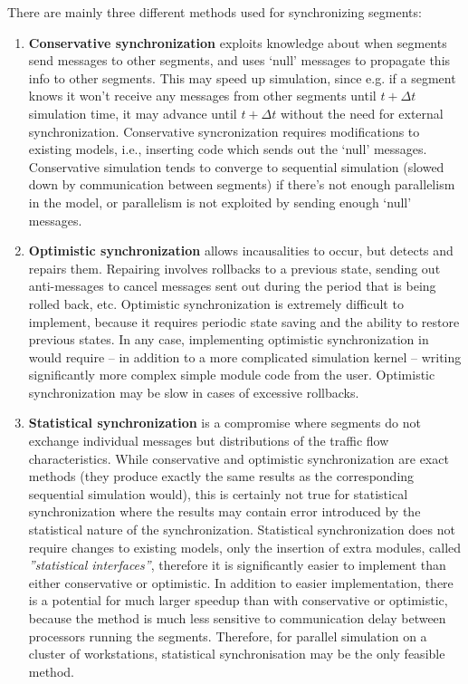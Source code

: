 There are mainly three different methods used for synchronizing
segments:
\begin{enumerate}
  \item{\textbf{Conservative synchronization} exploits knowledge about when segments send
    messages to other segments, and uses `null' messages to propagate
    this info to other segments. This may speed up simulation, since
    e.g. if a segment knows it won't receive any messages from other
    segments until $t+\Delta t$ simulation time, it may advance until
    $t+\Delta t$ without the need for external synchronization.
    Conservative syncronization requires modifications to existing
    models, i.e., inserting code which sends out the `null' messages.
    Conservative simulation tends to converge to sequential simulation
    (slowed down by communication between segments) if there's not
    enough parallelism in the model, or parallelism is not exploited
    by sending enough `null' messages.}

  \item{\textbf{Optimistic synchronization} allows incausalities to occur, but detects and
    repairs them. Repairing involves rollbacks to a previous state,
    sending out anti-messages to cancel messages sent out during the
    period that is being rolled back, etc.  Optimistic synchronization
    is extremely difficult to implement, because it requires periodic
    state saving and the ability to restore previous states. In any
    case, implementing optimistic synchronization in {\opp} would
    require -- in addition to a more complicated simulation kernel --
    writing significantly more complex simple
    module code from the user.  Optimistic synchronization may be slow
    in cases of excessive rollbacks.}

  \item{\textbf{Statistical synchronization} is a compromise where segments do not exchange
    individual messages but distributions of the traffic flow
    characteristics. While conservative and optimistic synchronization
    are exact methods (they produce exactly the same results as the
    corresponding sequential simulation would), this is certainly not
    true for statistical synchronization where the results may contain
    error introduced by the statistical nature of the synchronization.
    Statistical synchronization does not require changes to existing
    models, only the insertion of extra modules, called
    \textit{''statistical interfaces''}, therefore it is significantly
    easier to implement than either conservative or optimistic. In
    addition to easier implementation, there is a potential for much
    larger speedup than with conservative or optimistic, because the
    method is much less sensitive to communication delay between
    processors running the segments. Therefore, for parallel
    simulation on a cluster of workstations, statistical
    synchronisation may be the only feasible method.}
\end{enumerate}





